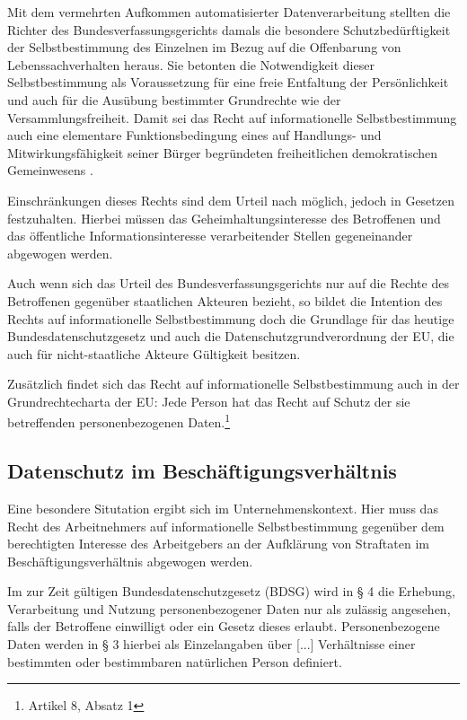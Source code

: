 Mit dem vermehrten Aufkommen automatisierter Datenverarbeitung stellten die Richter des Bundesverfassungsgerichts damals die besondere Schutzbedürftigkeit der Selbstbestimmung des Einzelnen im Bezug auf die Offenbarung von Lebenssachverhalten heraus. Sie betonten die Notwendigkeit dieser Selbstbestimmung als Voraussetzung für eine freie Entfaltung der Persönlichkeit und auch für die Ausübung bestimmter Grundrechte wie der Versammlungsfreiheit. Damit sei das Recht auf informationelle Selbstbestimmung auch \glqq eine elementare Funktionsbedingung eines auf Handlungs- und Mitwirkungsfähigkeit seiner Bürger begründeten freiheitlichen demokratischen Gemeinwesens\grqq{} \cite{TODO} .
    
Einschränkungen dieses Rechts sind dem Urteil nach möglich, jedoch in Gesetzen festzuhalten. Hierbei müssen das Geheimhaltungsinteresse des Betroffenen und das öffentliche Informationsinteresse verarbeitender Stellen gegeneinander abgewogen werden.

Auch wenn sich das Urteil des Bundesverfassungsgerichts nur auf die Rechte des Betroffenen gegenüber staatlichen Akteuren bezieht, so bildet die Intention des Rechts auf informationelle Selbstbestimmung doch die Grundlage für das heutige Bundesdatenschutzgesetz und auch die Datenschutzgrundverordnung der EU, die auch für nicht-staatliche Akteure Gültigkeit besitzen.

Zusätzlich findet sich das Recht auf informationelle Selbstbestimmung auch in der Grundrechtecharta der EU: \glqq Jede Person hat das Recht auf Schutz der sie betreffenden personenbezogenen Daten.\grqq{}\footnote{
  Artikel 8, Absatz 1
}

\subsection{Datenschutz im Beschäftigungsverhältnis}

Eine besondere Situtation ergibt sich im Unternehmenskontext. Hier muss das Recht des Arbeitnehmers auf informationelle Selbstbestimmung gegenüber dem berechtigten Interesse des Arbeitgebers an der Aufklärung von Straftaten im Beschäftigungsverhältnis abgewogen werden. 

Im zur Zeit gültigen Bundesdatenschutzgesetz (BDSG) wird in § 4 die Erhebung, Verarbeitung und Nutzung personenbezogener Daten nur als zulässig angesehen, falls der Betroffene einwilligt oder ein Gesetz dieses erlaubt. Personenbezogene Daten werden in § 3 hierbei als \glqq Einzelangaben über [...] Verhältnisse einer bestimmten oder bestimmbaren natürlichen Person\grqq{}  definiert.

